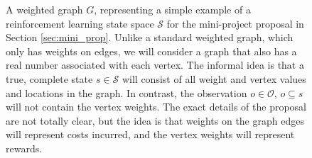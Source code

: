 \begin{figure}
\begin{center}
    \end{center}
    \caption{A weighted graph $G$, representing a simple example of a reinforcement learning state space $\mathcal S$ for the mini-project proposal in Section \ref{sec:mini_prop}. Unlike a standard weighted graph, which only has weights on edges, we will consider a graph that also has a real number associated with each vertex. The informal idea is that a true, complete state $s \in \mathcal S$ will consist of all weight and vertex values and locations in the graph. In contrast, the observation $o \in \mathcal O$, $o \subseteq s$ will not contain the vertex weights. The exact details of the proposal are not totally clear, but the idea is that weights on the graph edges will represent costs incurred, and the vertex weights will represent rewards.} %

\end{figure}
